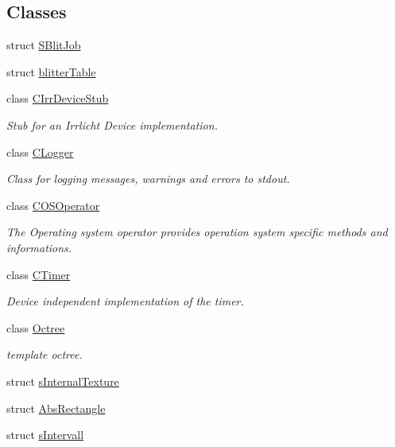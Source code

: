 \subsection*{Classes}
\begin{DoxyCompactItemize}
\item 
struct \hyperlink{structirr_1_1_s_blit_job}{S\-Blit\-Job}
\item 
struct \hyperlink{structirr_1_1blitter_table}{blitter\-Table}
\item 
class \hyperlink{classirr_1_1_c_irr_device_stub}{C\-Irr\-Device\-Stub}
\begin{DoxyCompactList}\small\item\em Stub for an Irrlicht Device implementation. \end{DoxyCompactList}\item 
class \hyperlink{classirr_1_1_c_logger}{C\-Logger}
\begin{DoxyCompactList}\small\item\em Class for logging messages, warnings and errors to stdout. \end{DoxyCompactList}\item 
class \hyperlink{classirr_1_1_c_o_s_operator}{C\-O\-S\-Operator}
\begin{DoxyCompactList}\small\item\em The Operating system operator provides operation system specific methods and informations. \end{DoxyCompactList}\item 
class \hyperlink{classirr_1_1_c_timer}{C\-Timer}
\begin{DoxyCompactList}\small\item\em Device independent implementation of the timer. \end{DoxyCompactList}\item 
class \hyperlink{classirr_1_1_octree}{Octree}
\begin{DoxyCompactList}\small\item\em template octree. \end{DoxyCompactList}\item 
struct \hyperlink{structirr_1_1s_internal_texture}{s\-Internal\-Texture}
\item 
struct \hyperlink{structirr_1_1_abs_rectangle}{Abs\-Rectangle}
\item 
struct \hyperlink{structirr_1_1s_intervall}{s\-Intervall}
\end{DoxyCompactItemize}
